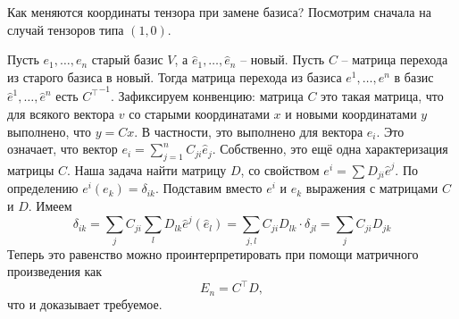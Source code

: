 Как меняются координаты тензора при замене базиса? Посмотрим сначала на случай тензоров типа $(1,0)$.

\thrm Пусть $e_1,\dots,e_n$ старый базис $V$, а $\hat{e}_1,\dots,\hat{e}_n$ -- новый. Пусть $C$ -- матрица перехода из старого базиса в новый. Тогда матрица перехода из базиса $e^1,\dots,e^n$ в базис $\hat{e}^1,\dots,\hat{e}^n$ есть ${C^{\top}}^{-1}$.
\proof Зафиксируем конвенцию: матрица $C$ это такая матрица, что для всякого вектора $v$ со старыми координатами $x$ и новыми координатами $y$ выполнено, что $y=Cx$. В частности, это выполнено для вектора $e_i$. Это означает, что вектор $e_i=\sum_{j=1}^nC_{ji}\hat{e}_j$. Собственно, это ещё одна характеризация матрицы $C$. Наша задача найти матрицу $D$, со свойством $e^i=\sum D_{ji}\hat{e}^j$. По определению $e^i(e_k)=\delta_{ik}$. Подставим вместо $e^i$ и $e_k$ выражения с матрицами $C$ и $D$. Имеем
$$\delta_{ik}=\sum_{j}C_{ji} \sum_{l}D_{lk}\hat{e}^j(\hat{e}_l)=\sum_{j,l}C_{ji}D_{lk}\cdot\delta_{jl}=\sum_{j}C_{ji}D_{jk}$$
Теперь это равенство можно проинтерпретировать при помощи матричного произведения как 
$$E_n=C^{\top}D,$$
что и доказывает требуемое.
\endproof
\ethrm

